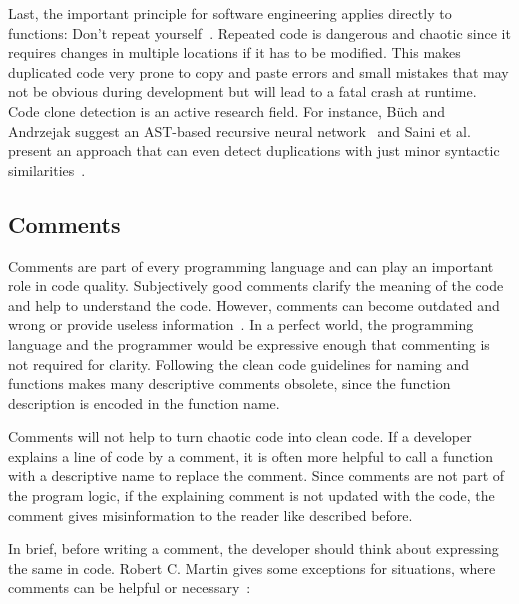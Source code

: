 Last, the important principle for software engineering applies directly to functions: Don't repeat yourself~\cite{haoyu_basic_2012}. Repeated code is dangerous and chaotic since it requires changes in multiple locations if it has to be modified. This makes duplicated code very prone to copy and paste errors and small mistakes that may not be obvious during development but will lead to a fatal crash at runtime. Code clone detection is an active research field. For instance, Büch and Andrzejak suggest an AST-based recursive neural network~\cite{buch_learning-based_2019} and Saini et al. present an approach that can even detect duplications with just minor syntactic similarities~\cite{saini_oreo_2018}.

\subsection{Comments}
Comments are part of every programming language and can play an important role in code quality. Subjectively good comments clarify the meaning of the code and help to understand the code. However, comments can become outdated and wrong or provide useless information~\cite{martin_clean_2009}. In a perfect world, the programming language and the programmer would be expressive enough that commenting is not required for clarity. Following the clean code guidelines for naming and functions makes many descriptive comments obsolete, since the function description is encoded in the function name.

Comments will not help to turn chaotic code into clean code. If a developer explains a line of code by a comment, it is often more helpful to call a function with a descriptive name to replace the comment. Since comments are not part of the program logic, if the explaining comment is not updated with the code, the comment gives misinformation to the reader like described before.

In brief, before writing a comment, the developer should think about expressing the same in code. Robert C. Martin gives some exceptions for situations, where comments can be helpful or necessary~\cite{martin_clean_2009}:

